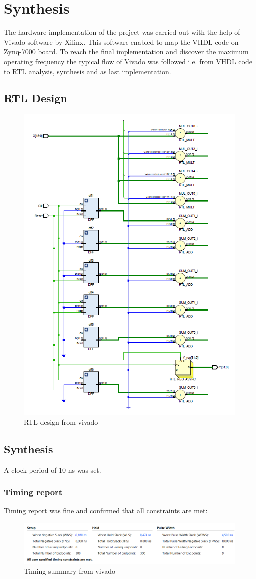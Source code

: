 \section{Synthesis} %
The hardware implementation of the project was carried out with the help of Vivado software by Xilinx. This software enabled to map the VHDL code on Zynq-7000 board. To reach the final implementation and discover the maximum operating frequency the typical flow of Vivado was followed i.e. from VHDL code to RTL analysis, synthesis and as last implementation.
\label{sec:synthesis_and_implementation}
\subsection{RTL Design}
\begin{figure}[H]
  \centering
  \includegraphics[width=0.7\linewidth]{./images/schematic.PNG}
  \caption{RTL design from vivado}
  \label{fig:schematic}
\end{figure}
\subsection{Synthesis}
A clock period of 10 ns was set.

\subsubsection{Timing report} %
\label{ssub:timing_report}
Timing report was fine and confirmed that all constraints are met:
\begin{figure}[H]
  \centering
  \includegraphics[width=0.9\linewidth]{./images/timing.PNG}
  \caption{Timing summary from vivado}
  \label{fig:timing}
\end{figure}


